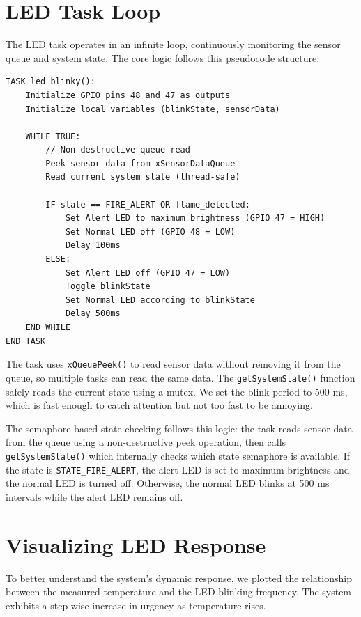 \section{LED Task Loop}

The LED task operates in an infinite loop, continuously monitoring the sensor queue and system state. The core logic follows this pseudocode structure:

\begin{verbatim}
TASK led_blinky():
    Initialize GPIO pins 48 and 47 as outputs
    Initialize local variables (blinkState, sensorData)
    
    WHILE TRUE:
        // Non-destructive queue read
        Peek sensor data from xSensorDataQueue
        Read current system state (thread-safe)
        
        IF state == FIRE_ALERT OR flame_detected:
            Set Alert LED to maximum brightness (GPIO 47 = HIGH)
            Set Normal LED off (GPIO 48 = LOW)
            Delay 100ms
        ELSE:
            Set Alert LED off (GPIO 47 = LOW)
            Toggle blinkState
            Set Normal LED according to blinkState
            Delay 500ms
    END WHILE
END TASK
\end{verbatim}

The task uses \texttt{xQueuePeek()} to read sensor data without removing it from the queue, so multiple tasks can read the same data. The \texttt{getSystemState()} function safely reads the current state using a mutex. We set the blink period to 500 ms, which is fast enough to catch attention but not too fast to be annoying.

The semaphore-based state checking follows this logic: the task reads sensor data from the queue using a non-destructive peek operation, then calls \texttt{getSystemState()} which internally checks which state semaphore is available. If the state is \texttt{STATE\_FIRE\_ALERT}, the alert LED is set to maximum brightness and the normal LED is turned off. Otherwise, the normal LED blinks at 500 ms intervals while the alert LED remains off.

\section{Visualizing LED Response}

To better understand the system's dynamic response, we plotted the relationship between the measured temperature and the LED blinking frequency. The system exhibits a step-wise increase in urgency as temperature rises.

